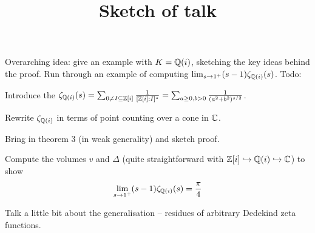 \documentclass[11pt]{article}
\title{Sketch of talk}
\begin{document}
\maketitle


Overarching idea: give an example with $K = \mathbb{Q}(i)$, sketching the key ideas behind the proof. Run through an example of computing $\lim_{s \to 1^+} (s - 1)\zeta_{\mathbb{Q}(i)}(s)$. Todo:
\begin{enum}
    \item Introduce the $\zeta_{\mathbb{Q}(i)}(s) = \sum_{0 \neq I \subseteq \mathbb{Z}[i]}\frac1{[\mathbb{Z}[i] : I]^s} = \sum_{a \geq 0, b > 0}\frac1{(a^2 + b^2)^{s/2}}$.
    \item Rewrite $\zeta_{\mathbb{Q}(i)}$ in terms of point counting over a cone in $\mathbb{C}$.
    \item Bring in theorem 3 (in weak generality) and sketch proof.
    \item Compute the volumes $v$ and $\Delta$ (quite straightforward with $\mathbb{Z}[i] \hookrightarrow \mathbb{Q}(i) \hookrightarrow \mathbb{C}$) to show 
    $$
        \lim_{s \to 1^+}(s - 1)\zeta_{\mathbb{Q}(i)}(s) = \frac\pi4
    $$
    \item Talk a little bit about the generalisation -- residues of arbitrary Dedekind zeta functions.
\end{enum}
\end{document}
